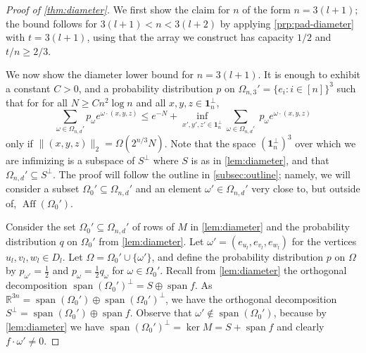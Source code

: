 \documentclass[10pt,a4paper]{article}
\numberwithin{equation}{section}
\DeclareMathOperator{\aff}{Aff}
\DeclareMathOperator{\spn}{span}
\newcommand{\RR}{\mathbb R}
\newcommand{\id}{\mathbf{1}}
\begin{document}
\begin{proof}[Proof of \cref{thm:diameter}] We first show the claim for $n$ of the form $n = 3(l + 1)$; the bound follows for $3(l+1) < n < 3(l + 2)$ by applying \cref{prp:pad-diameter} with $t = 3(l +1)$, using that the array we construct has capacity $1/2$ and $t/n \geq 2/3$. 

We now show the diameter lower bound for $n = 3(l+1)$. It is enough to exhibit a constant $C>0$, and a probability distribution $p$ on $\Omega_{n,3}' = \{e_i: i \in [n]\}^3$ such that for for all $N \geq C n^2 \log n$ and all $x, y, z \in \id_n^\perp$, 
 $$\sum_{\omega \in \Omega_{n,d}'} p_\omega e^{\omega \cdot (x,y,z)} \leq  e^{-N} + \inf_{x', y', z' \in \id_n^\perp} \sum_{\omega \in \Omega_{n,d}'}\; p_\omega e^{\omega \cdot (x,y,z)}$$
 only if $\|(x,y,z)\|_2 = \Omega( 2^{n/3} N)$. Note that the space $(\id_n^\perp)^3$ over which we are infimizing is a subspace of $S^\perp$ where $S$ is as in \cref{lem:diameter}, and that $\Omega_{n,d}' \subseteq S^\perp$. The proof will follow the outline in \cref{subsec:outline}; namely, we will consider a subset $\Omega_0' \subseteq \Omega_{n,d}'$ and an element $\omega' \in \Omega_{n,d}'$ very close to, but outside of, $\aff(\Omega_0')$.

Consider the set $\Omega_0' \subseteq \Omega_{n,d}'$ of rows of $M$ in \cref{lem:diameter} and the probability distribution $q$ on $\Omega_0'$ from \cref{lem:diameter}. Let $\omega' = (e_{u_l}, e_{v_l}, e_{w_l})$ for the vertices $u_l, v_l, w_l \in D_l$.
Let $\Omega = \Omega_0' \cup \{\omega'\}$, and define the probability distribution $p$ on $\Omega$ by $p_{\omega'} = \frac{1}{2}$ and $p_{\omega} = \frac{1}{2} q_{\omega}$ for $\omega \in \Omega_0'$. Recall from \cref{lem:diameter} the orthogonal decomposition $\spn(\Omega_0')^\perp = S \oplus \spn{f}$. As $\RR^{3n} = \spn(\Omega_0') \oplus \spn(\Omega_0')^\perp$, we have the orthogonal decomposition $S^\perp = \spn(\Omega_0') \oplus \spn f$. Observe that $\omega' \not\in \spn(\Omega_0')$, because by \cref{lem:diameter} we have $\spn (\Omega_0')^\perp = \ker M =  S + \spn f$ and clearly $f \cdot \omega' \neq 0$.


\end{proof}
\end{document}
